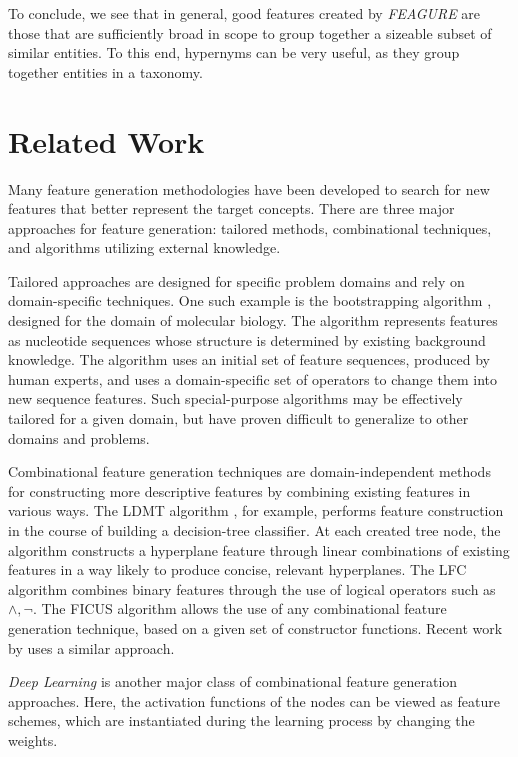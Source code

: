 \documentclass[twoside,11pt]{article}
\theoremstyle{definition}
\begin{document}
To conclude, we see that in general, good features created by \emph{FEAGURE} are those that are sufficiently broad in scope to group together a sizeable subset of similar entities. To this end, hypernyms can be very useful, as they group together entities in a taxonomy. 

\section{Related Work}

Many feature generation methodologies have been developed to search for new features that better represent the target concepts. There are three major approaches for feature generation: tailored methods, combinational techniques, and algorithms utilizing external knowledge.

Tailored approaches \cite{sutton1991learning,hirsh1994bootstrapping} are designed for specific problem domains and rely on domain-specific techniques. %
One such example is the bootstrapping algorithm \cite{hirsh1994bootstrapping}, designed for the domain of molecular biology. The algorithm represents features as nucleotide sequences whose structure is determined by existing background knowledge. The algorithm uses an initial set of feature sequences, produced by human experts, and uses a domain-specific set of operators to change them into new sequence features. 
Such special-purpose algorithms  may be effectively tailored for a given domain, but have proven difficult to generalize to other domains and problems.

Combinational feature generation techniques are domain-independent methods for constructing more descriptive features by combining existing features in various ways. The LDMT algorithm \cite{utgo1991linear}, for example, performs feature construction in the course of building a decision-tree classifier. At each created tree node, the algorithm constructs a hyperplane feature through linear combinations of existing features in a way likely to produce concise, relevant hyperplanes. The LFC algorithm \cite{ragavan1993complex} combines binary features through the use of logical operators such as $\land ,\lnot$.
The FICUS algorithm \cite{markovitch2002feature} allows the use of any combinational feature generation technique, based on a given set of constructor functions. Recent work by  uses a similar approach.

\emph{Deep Learning}  is another major class of combinational feature generation approaches. Here, the activation functions of the nodes can be viewed as feature schemes, which are instantiated during the learning process by changing the weights.
\end{document}
